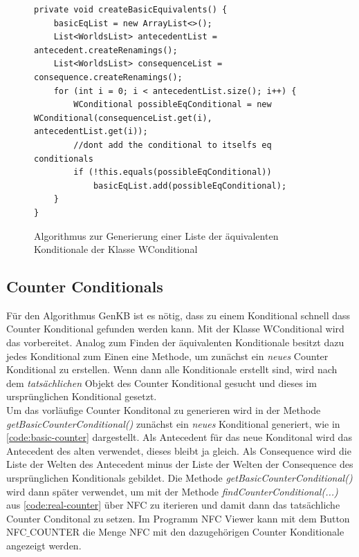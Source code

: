 \documentclass[12pt,a4paper]{article}
\begin{document}
\begin{figure}
\begin{lstlisting}
private void createBasicEquivalents() {
    basicEqList = new ArrayList<>();
    List<WorldsList> antecedentList = antecedent.createRenamings();
    List<WorldsList> consequenceList = consequence.createRenamings();
    for (int i = 0; i < antecedentList.size(); i++) {
        WConditional possibleEqConditional = new WConditional(consequenceList.get(i), antecedentList.get(i));
        //dont add the conditional to itselfs eq conditionals
        if (!this.equals(possibleEqConditional))
            basicEqList.add(possibleEqConditional);
    }
}
\end{lstlisting}
\caption{Algorithmus zur Generierung einer Liste der äquivalenten Konditionale der Klasse WConditional}
\label{code:create-equivalents}
\end{figure} 




\subsection{Counter Conditionals}
\label{sec:counter-conditonals}
Für den Algorithmus GenKB ist es nötig, dass zu einem Konditional schnell dass Counter Konditional gefunden werden kann. Mit der Klasse WConditional wird das vorbereitet. Analog zum Finden der äquivalenten Konditionale besitzt dazu jedes Konditional zum Einen eine Methode, um zunächst ein \textit{neues} Counter Konditional zu erstellen. Wenn dann alle Konditionale erstellt sind, wird nach dem \textit{tatsächlichen} Objekt des Counter Konditional gesucht und dieses im ursprünglichen Konditional gesetzt. \\
Um das vorläufige Counter Konditonal zu generieren wird in der Methode \textit{getBasicCounterConditional()} zunächst ein \textit{neues} Konditional generiert, wie in \autoref{code:basic-counter} dargestellt. Als Antecedent für das neue Konditonal wird das Antecedent des alten verwendet, dieses bleibt ja gleich. Als Consequence wird die Liste der Welten des Antecedent minus der Liste der Welten der Consequence  des ursprünglichen Konditionals gebildet. Die Methode \textit{getBasicCounterConditional()} wird dann später verwendet, um mit der Methode \textit{findCounterConditional(...)} aus \autoref{code:real-counter} über NFC zu iterieren und damit dann das tatsächliche Counter Conditonal zu setzen. Im Programm NFC Viewer kann mit dem Button NFC$\_$COUNTER die Menge NFC mit den dazugehörigen Counter Konditionale angezeigt werden.
\end{document}
